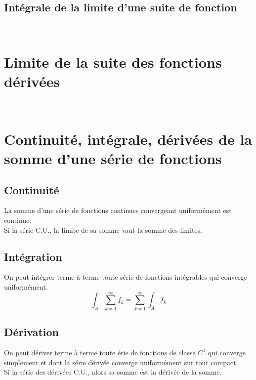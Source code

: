 \documentclass[11pt, a4paper, openany]{book}
\newcommand{\serie}{\sum_{k=1}^\infty}
\begin{document}
		\subsection{Intégrale de la limite d'une suite de fonction}
		\ 
							
							
		\section{Limite de la suite des fonctions dérivées}
		\ 
							
		\setcounter{section}{6}
		\section{Continuité, intégrale, dérivées de la somme d'une série de fonctions}
		\subsection{Continuité}
		La somme d'une série de fonctions continues convergeant uniformément est continue.\\
		Si la série C.U., la limite de sa somme vaut la somme des limites.
		\subsection{Intégration}
		On peut intégrer terme à terme toute série de fonctions intégrables qui converge uniformément.
		\begin{equation}
			\int_A \serie f_k = \serie \int_A f_k
		\end{equation}
							
		\subsection{Dérivation}
		On peut dériver terme à terme toute érie de fonctions de classe $C^1$ qui converge simplement et dont la série dérivée converge uniformément sur tout compact.\\
		Si la série des dérivées C.U., alors sa somme est la dérivée de la somme.
							
\end{document}
